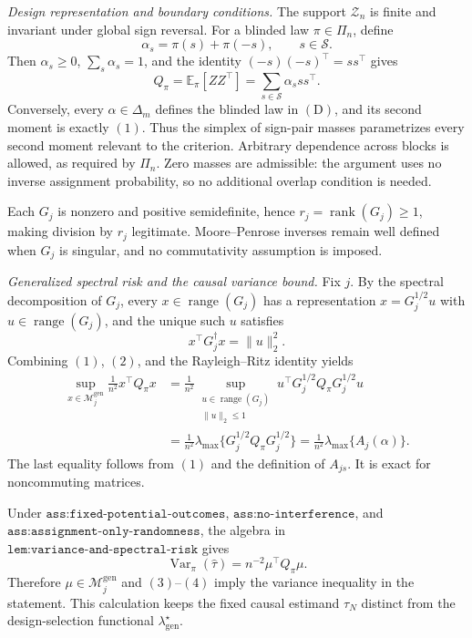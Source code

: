 \textit{Design representation and boundary conditions.}
The support \(\mathcal Z_n\) is finite and invariant under global sign reversal.  For a blinded law \(\pi\in\Pi_n\), define
\[
\alpha_s=\pi(s)+\pi(-s),\qquad s\in\mathscr S.
\]
Then \(\alpha_s\ge0\), \(\sum_s\alpha_s=1\), and the identity \((-s)(-s)^\top=ss^\top\) gives
\[
Q_\pi=\mathbb E_\pi[ZZ^\top]
=\sum_{s\in\mathscr S}\alpha_sss^\top.
\tag{1}
\]
Conversely, every \(\alpha\in\Delta_m\) defines the blinded law in \((\mathrm D)\), and its second moment is exactly \((1)\).  Thus the simplex of sign-pair masses parametrizes every second moment relevant to the criterion.  Arbitrary dependence across blocks is allowed, as required by \(\Pi_n\).  Zero masses are admissible: the argument uses no inverse assignment probability, so no additional overlap condition is needed.

Each \(G_j\) is nonzero and positive semidefinite, hence \(r_j=\operatorname{rank}(G_j)\ge1\), making division by \(r_j\) legitimate.  Moore--Penrose inverses remain well defined when \(G_j\) is singular, and no commutativity assumption is imposed.

\textit{Generalized spectral risk and the causal variance bound.}
Fix \(j\).  By the spectral decomposition of \(G_j\), every \(x\in\operatorname{range}(G_j)\) has a representation \(x=G_j^{1/2}u\) with \(u\in\operatorname{range}(G_j)\), and the unique such \(u\) satisfies
\[
x^\top G_j^\dagger x=\lVert u\rVert_2^2.
\tag{2}
\]
Combining \((1)\), \((2)\), and the Rayleigh--Ritz identity yields
\[
\begin{aligned}
\sup_{x\in\mathcal M_j^{\mathrm{gen}}}
\frac1{n^2}x^\top Q_\pi x
&=\frac1{n^2}
\sup_{\substack{u\in\operatorname{range}(G_j)\\\lVert u\rVert_2\le1}}
u^\top G_j^{1/2}Q_\pi G_j^{1/2}u\\
&=\frac1{n^2}\lambda_{\max}
\{G_j^{1/2}Q_\pi G_j^{1/2}\}
=\frac1{n^2}\lambda_{\max}\{A_j(\alpha)\}.
\end{aligned}
\tag{3}
\]
The last equality follows from \((1)\) and the definition of \(A_{js}\).  It is exact for noncommuting matrices.

Under \(\texttt{ass:fixed-potential-outcomes}\), \(\texttt{ass:no-interference}\), and \(\texttt{ass:assignment-only-randomness}\), the algebra in \(\texttt{lem:variance-and-spectral-risk}\) gives
\[
\operatorname{Var}_\pi(\widehat\tau)
=n^{-2}\mu^\top Q_\pi\mu.
\tag{4}
\]
Therefore \(\mu\in\mathcal M_j^{\mathrm{gen}}\) and \((3)\)--\((4)\) imply the variance inequality in the statement.  This calculation keeps the fixed causal estimand \(\tau_N\) distinct from the design-selection functional \(\lambda_{\mathrm{gen}}^\star\).

